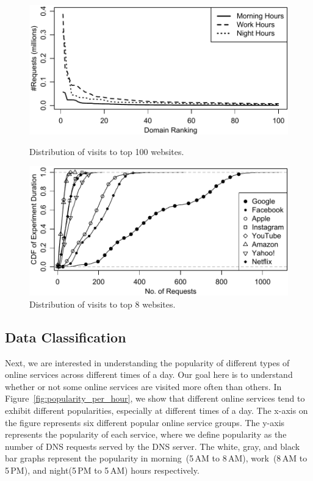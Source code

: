 \documentclass[letterpaper,twocolumn]{article}
\begin{document}
 \begin{figure}[t]
\centering
{}
\includegraphics[width=\linewidth]{img/domain_popularity_over_time}
\vspace{-17pt}
\caption{Distribution of visits to top 100 websites.}
 \label{fig:domain_popularity}
  \endminipage
  \hfill
\includegraphics[width=\linewidth]{img/website_popularity_cdf}
\vspace{-17pt}
\caption{Distribution of visits to top 8 websites.}
 \label{fig:website_popularity_per_hour}
  \endminipage
  \vspace{-15pt}
 \end{figure}


\vspace{-8pt}
\subsection{Data Classification}
\vspace{-8pt}

Next, we are interested in understanding the popularity of different types of online services across different times of a day.
Our goal here is to understand whether or not some online services are visited more often than others.
In Figure~\ref{fig:popularity_per_hour}, we show that different online services tend to exhibit different popularities, especially at different times of a day.
The x-axis on the figure represents six different popular online service groups.
The y-axis represents the popularity of each service, where we define popularity as the number of DNS requests served by the DNS server.
The white, gray, and black bar graphs represent the popularity in morning~(5\,AM to 8\,AM), work~(8\,AM to 5\,PM), and night(5\,PM to 5\,AM) hours respectively.
\end{document}
